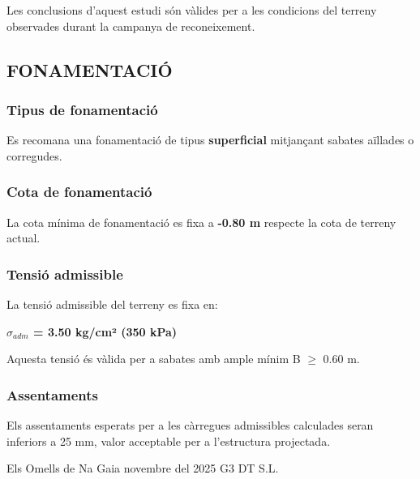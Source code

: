 \documentclass{g3dt-report}
\begin{document}
Les conclusions d'aquest estudi són vàlides per a les condicions del terreny observades durant la campanya de reconeixement.

\subsection{FONAMENTACIÓ}

\subsubsection{Tipus de fonamentació}

Es recomana una fonamentació de tipus \textbf{superficial} mitjançant sabates aïllades o corregudes.

\subsubsection{Cota de fonamentació}

La cota mínima de fonamentació es fixa a \textbf{-0.80 m} respecte la cota de terreny actual.

\subsubsection{Tensió admissible}

La tensió admissible del terreny es fixa en:

\begin{center}
\textbf{$\sigma_{adm}$ = 3.50 kg/cm² (350 kPa)}
\end{center}

Aquesta tensió és vàlida per a sabates amb ample mínim B $\geq$ 0.60 m.

\subsubsection{Assentaments}

Els assentaments esperats per a les càrregues admissibles calculades seran inferiors a 25 mm, valor acceptable per a l'estructura projectada.


\signaturepage
    {Els Omells de Na Gaia}
    {novembre del 2025}
    {G3 DT S.L.}

\end{document}
